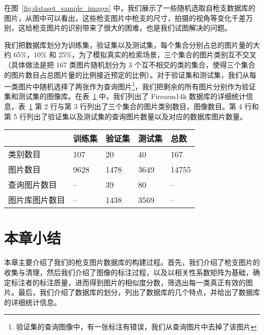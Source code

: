 在图~\ref{fig:dataset_sample_images} 中，我们展示了一些随机选取自枪支数据库的图片，从图中可以看出，这些枪支图片中枪支的尺寸，拍摄的视角等变化千差万别，这给枪支图片的识别带来了很大的困难，也是我们试图解决的问题。

我们把数据库划分为训练集，验证集以及测试集，每个集合分别占总的图片量的大约 65\%，10\% 和 25\%，为了模拟真实的检索场景，三个集合的图片类别互不交叉 （具体做法是把 167 类图片随机划分为 3 个互不相交的类的集合，使得三个集合的图片数目占总图片量的比例接近预定的比例）。对于验证集和测试集，我们从每一类图片中随机选择了两张作为查询图片\footnote{验证集的查询图像中，有一张标注有错误，我们从查询图片中去掉了该图片}，我们把剩余的所有图片分别作为验证集和测试集的图像库。在表~\ref{table:train_val_test_stat} 中，我们列出了 Firearm14k 数据库的详细统计信息，表~\ref{table:train_val_test_stat} 第 2 行与第 3 行列出了三个集合的图片类别数目，图像数目。第 4 行和第 5 行列出了验证集以及测试集的查询图片数量以及对应的数据库图片数量。

\begin{table}[h]
	\centering
	\label{table:train_val_test_stat}
	\begin{tabular}{@{}lllll@{}}
		\toprule
		          & 训练集 & 验证集 & 测试集 & 总数\\
		\midrule
		类别数目 & 107       & 20             & 40  & 167      \\
		图片数目 & 9628      & 1478           & 3649 & 14755    \\
		查询图片数目 &   --   & 39             & 80  &     --  \\
		图片库图片数目 &  --& 1438 &  3569  & --\\
		\bottomrule
	\end{tabular}
\end{table}

\section{本章小结}
本章主要介绍了我们的枪支图片数据库的构建过程。首先，我们介绍了枪支图片的收集与清理，然后我们介绍了图像的标注过程，以及以相关性系数矩阵为基础，确定标注者的标注质量，进而得到图片的相似度分数，筛选出每一类真正有效的图片。最后，我们介绍了数据库的划分，列出了数据库的几个特点，并给出了数据库的详细统计信息。



